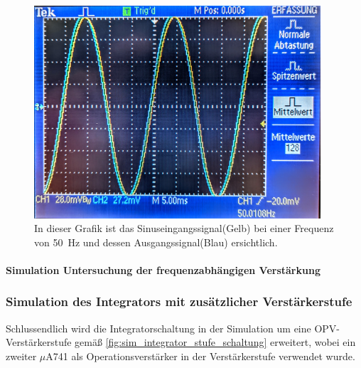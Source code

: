 \documentclass[12pt,english,ngerman]{scrartcl}
\begin{document}
\begin{figure}[H]
  \centering
   \includegraphics[width=0.95\textwidth]{./figures/integrator/50hz.jpg}
    \caption{In dieser Grafik ist das Sinuseingangssignal(Gelb) bei einer Frequenz von
    \SI{50}{\Hz} und dessen Ausgangssignal(Blau) ersichtlich.}
  \label{fig:mess_integrator_50hz}
\end{figure}

\paragraph{Simulation Untersuchung der frequenzabhängigen Verstärkung}

\subsubsection{Simulation des Integrators mit zusätzlicher Verstärkerstufe}

Schlussendlich wird die Integratorschaltung in der Simulation um eine
OPV-Verstärkerstufe gemäß \autoref{fig:sim_integrator_stufe_schaltung}
erweitert, wobei ein zweiter $\mu$A741 als Operationsverstärker in der
Verstärkerstufe verwendet wurde.
\end{document}
